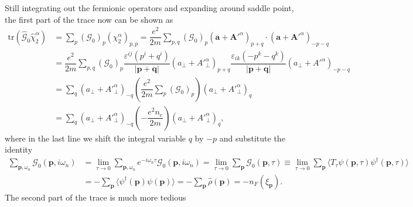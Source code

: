 \documentclass[bachelor,english,numbers]{ustcthesis}
\begin{document}
		\indent Still integrating out the fermionic operators and expanding around saddle point, the first part of the trace now can be shown as
		\begin{align}\label{2.4.6}
			\mathrm{tr}\left(\hat{\mathcal{G}}_0\hat{\chi}^\alpha_2\right)&=\sum_p(\mathcal{G}_0)_p (\chi^\alpha_2)_{p,p}=\dfrac{e^2}{2m}\sum_{p,q}(\mathcal{G}_0)_p(\bm{a}+\bm{A'}^\alpha)_{p+q}\cdot(\bm{a}+\bm{A'}^\alpha)_{-p-q}\nonumber\\
			&=\dfrac{e^2}{2m}\sum_{p,q}(\mathcal{G}_0)_p\dfrac{\varepsilon^{ij}(p^i+q^i)}{|\bm{p}+\bm{q}|}(a_{\perp}+{A'}^\alpha_\perp)_{p+q}\dfrac{\varepsilon_{ik}(-p^k-q^k)}{|\bm{p}+\bm{q}|}(a_{\perp}+{A'}^\alpha)_{-p-q}\nonumber\\
			&=\sum_q(a_{\perp}+{A'}^\alpha_\perp)_{-q}\left(\dfrac{e^2}{2m}\sum_p(\mathcal{G}_0)_p\right)(a_{\perp}+{A'}^\alpha_\perp)_{q}\nonumber\\
			&=\sum_q(a_{\perp}+{A'}^\alpha_\perp)_{-q}\left(-\dfrac{e^2n_e}{2m}\right)(a_{\perp}+{A'}^\alpha_\perp)_{q},
		\end{align}
		where in the last line we shift the integral variable $q$ by $-p$ and substitute the identity
		\begin{align*}
			\sum_{\bm{p},\omega_n} \mathcal{G}_0(\bm{p},i\omega_n)&=\lim_{\tau \rightarrow 0}\sum_{\bm{p},\omega_n}e^{-i\omega_n \tau} \mathcal{G}_0(\bm{p},i\omega_n)=\lim_{\tau\rightarrow 0}\sum_{\bm{p}}\mathcal{G}_0(\bm{p},\tau)\equiv\lim_{\tau \rightarrow 0}\sum_{\bm{p}}\langle T_\tau\psi(\bm{p},\tau)\psi^\dagger(\bm{p},\tau)\rangle\nonumber\\
			&=-\sum_{\bm{p}}\langle\psi^\dagger(\bm{p})\psi(\bm{p})\rangle=-\sum_{\bm{p}}\hat{\rho}(\bm{p})=-n_F(\xi_{\bm{p}}).
		\end{align*}
		The second part of the trace is much more tedious
\end{document}
